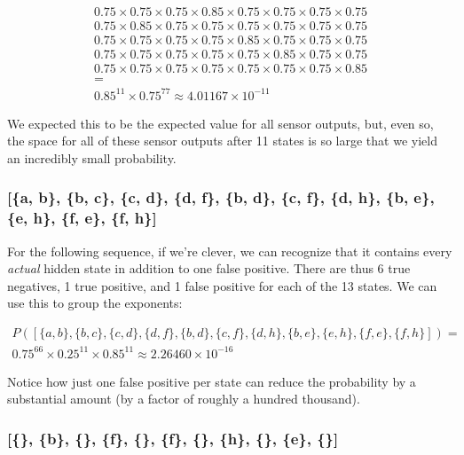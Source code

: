 \documentclass{article}
\begin{document}
$$\begin{gathered}
0.75 \times 0.75 \times 0.75 \times 0.85 \times 0.75 \times 0.75 \times 0.75 \times 0.75 \\
0.75 \times 0.85 \times 0.75 \times 0.75 \times 0.75 \times 0.75 \times 0.75 \times 0.75 \\
0.75 \times 0.75 \times 0.75 \times 0.75 \times 0.85 \times 0.75 \times 0.75 \times 0.75 \\
0.75 \times 0.75 \times 0.75 \times 0.75 \times 0.75 \times 0.85 \times 0.75 \times 0.75 \\
0.75 \times 0.75 \times 0.75 \times 0.75 \times 0.75 \times 0.75 \times 0.75 \times 0.85 \\
=\\
0.85^{11} \times 0.75^{77} \approx 4.01167 \times 10^{-11}
\end{gathered}
$$

We expected this to be the expected value for all sensor outputs, but, even so, 
the space for all of these sensor outputs after 11 states is so large that we 
yield an incredibly small probability.

\subsubsection{[\{a, b\}, \{b, c\}, \{c, d\}, \{d, f\}, \{b, d\}, \{c, f\}, \{d, h\}, \{b, e\}, \{e, h\}, \{f, e\}, \{f, h\}]}

For the following sequence, if we're clever, we can recognize that it contains 
every \textit{actual} hidden state in addition to one false positive. There are 
thus 6 true negatives, 1 true positive, and 1 false positive for each of the 13 
states. We can use this to group the exponents:

$$
\begin{gathered}
P([\{a, b\}, \{b, c\}, \{c, d\}, \{d, f\}, \{b, d\}, \{c, f\}, \{d, h\}, \{b, e\}, \{e, h\}, \{f, e\}, \{f, h\}]) = \\
0.75^{66} \times 0.25^{11} \times 0.85^{11} \approx 2.26460 \times 10^{-16}
\end{gathered}
$$

Notice how just one false positive per state can reduce the probability by a 
substantial amount (by a factor of roughly a hundred thousand).

\subsubsection{[\{\}, \{b\}, \{\}, \{f\}, \{\}, \{f\}, \{\}, \{h\}, \{\}, \{e\}, \{\}]}
\end{document}
